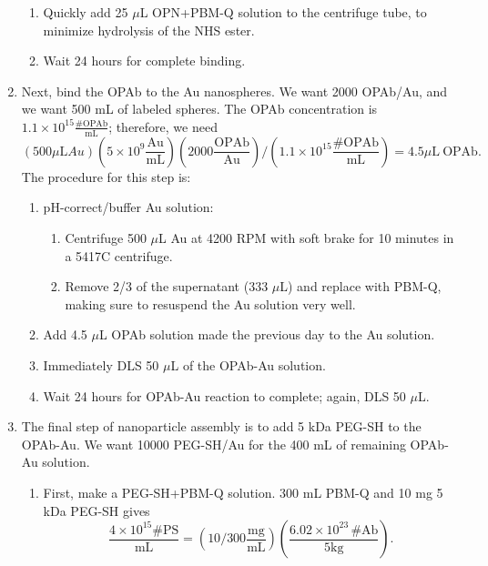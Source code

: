 \begin{enumerate}
\begin{enumerate}
\item Quickly add 25 $\mu$L OPN+PBM-Q solution to the centrifuge tube, to minimize hydrolysis of the NHS ester.

\item Wait 24 hours for complete binding.

\end{enumerate}

\item Next, bind the OPAb to the Au nanospheres. We want 2000 OPAb\slash Au, and we want 500 mL of labeled spheres. The OPAb concentration is $1.1\times10^{15} \mathrm{\frac{\#OPAb}{mL}}$; therefore, we need
\[\left(500 \mu\mathrm{L} Au\right)\left(5\times10^9\mathrm{\frac{Au}{mL}}\right)\left(2000\mathrm{\frac{OPAb}{Au}}\right)/\left(1.1\times10^{15} \mathrm{\frac{\#OPAb}{mL}}\right)=4.5\mu\mathrm{L\ OPAb}.\] The procedure for this step is:

\begin{enumerate}
\item pH-correct\slash buffer Au solution:

\begin{enumerate}
\item Centrifuge 500 $\mu$L Au at 4200 RPM with soft brake for 10 minutes in a 5417C centrifuge.

\item Remove 2\slash 3 of the supernatant (333 $\mu$L) and replace with PBM-Q, making sure to resuspend the Au solution very well.

\end{enumerate}

\item Add 4.5 $\mu$L OPAb solution made the previous day to the Au solution.

\item Immediately DLS 50 $\mu$L of the OPAb-Au solution.

\item Wait 24 hours for OPAb-Au reaction to complete; again, DLS 50 $\mu$L.

\end{enumerate}

\item The final step of nanoparticle assembly is to add 5 kDa PEG-SH to the OPAb-Au. We want 10000 PEG-SH\slash Au for the 400 mL of remaining OPAb-Au solution.

\begin{enumerate}
\item First, make a PEG-SH+PBM-Q solution. 300 mL PBM-Q and 10 mg 5 kDa PEG-SH gives \[\frac{4\times10^{15}\#\mathrm{PS}}{\mathrm{mL}}=\left(10/300\mathrm{\frac{mg}{mL}}\right)\left(\frac{6.02\times10^{23}\,\#\mathrm{Ab}}{5 \mathrm{kg}}\right).\]


\end{enumerate}
\end{enumerate}
